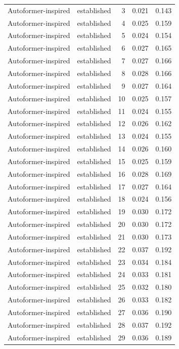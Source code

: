 \begin{tabular}{llrrr}
Autoformer-inspired & established & 3 & 0.021 & 0.143 \\
Autoformer-inspired & established & 4 & 0.025 & 0.159 \\
Autoformer-inspired & established & 5 & 0.024 & 0.154 \\
Autoformer-inspired & established & 6 & 0.027 & 0.165 \\
Autoformer-inspired & established & 7 & 0.027 & 0.166 \\
Autoformer-inspired & established & 8 & 0.028 & 0.166 \\
Autoformer-inspired & established & 9 & 0.027 & 0.164 \\
Autoformer-inspired & established & 10 & 0.025 & 0.157 \\
Autoformer-inspired & established & 11 & 0.024 & 0.155 \\
Autoformer-inspired & established & 12 & 0.026 & 0.162 \\
Autoformer-inspired & established & 13 & 0.024 & 0.155 \\
Autoformer-inspired & established & 14 & 0.026 & 0.160 \\
Autoformer-inspired & established & 15 & 0.025 & 0.159 \\
Autoformer-inspired & established & 16 & 0.028 & 0.169 \\
Autoformer-inspired & established & 17 & 0.027 & 0.164 \\
Autoformer-inspired & established & 18 & 0.024 & 0.156 \\
Autoformer-inspired & established & 19 & 0.030 & 0.172 \\
Autoformer-inspired & established & 20 & 0.030 & 0.172 \\
Autoformer-inspired & established & 21 & 0.030 & 0.173 \\
Autoformer-inspired & established & 22 & 0.037 & 0.192 \\
Autoformer-inspired & established & 23 & 0.034 & 0.184 \\
Autoformer-inspired & established & 24 & 0.033 & 0.181 \\
Autoformer-inspired & established & 25 & 0.032 & 0.180 \\
Autoformer-inspired & established & 26 & 0.033 & 0.182 \\
Autoformer-inspired & established & 27 & 0.036 & 0.190 \\
Autoformer-inspired & established & 28 & 0.037 & 0.192 \\
Autoformer-inspired & established & 29 & 0.036 & 0.189 \\

\end{tabular}
